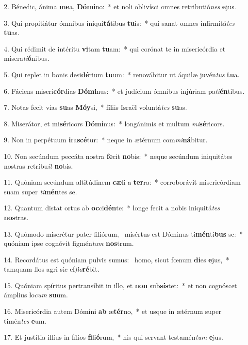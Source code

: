 2. Bénedic, ánima \textbf{me}a, \textbf{Dó}\textbf{mi}no:~*  et noli oblivísci omnes retributió\textit{nes} \textbf{e}jus.\

3. Qui propitiátur ómnibus iniqui\textbf{tá}tibus \textbf{tu}is:~*  qui sanat omnes infirmitá\textit{tes} \textbf{tu}as.\

4. Qui rédimit de intéritu \textbf{vi}tam \textbf{tu}am:~*  qui corónat te in misericórdia et misera\textit{ti}\textbf{ó}nibus.\

5. Qui replet in bonis desi\textbf{dé}rium \textbf{tu}um:~*  renovábitur ut áquilæ juvén\textit{tus} \textbf{tu}a.\

6. Fáciens miseri\textbf{cór}dias \textbf{Dó}\textbf{mi}nus:~*  et judícium ómnibus injúriam pa\textit{ti}\textbf{én}tibus.\

7. Notas fecit vias \textbf{su}as \textbf{Mó}\textbf{y}si,~*  fíliis Israël voluntá\textit{tes} \textbf{su}as.\

8. Miserátor, et mi\textbf{sé}ricors \textbf{Dó}\textbf{mi}nus:~*  longánimis et multum \textit{mi}\textbf{sé}ricors.\

9. Non in perpétuum \textbf{i}ra\textbf{scé}tur:~*  neque in ætérnum com\textit{mi}\textbf{ná}bitur.\

10. Non secúndum peccáta nostra \textbf{fe}cit \textbf{no}bis:~*  neque secúndum iniquitátes nostras retríbu\textit{it} \textbf{no}bis.\

11. Quóniam secúndum altitúdinem \textbf{cæ}li a \textbf{ter}ra:~*  corroborávit misericórdiam suam super \textit{ti}\textbf{mén}tes se.\

12. Quantum distat ortus ab \textbf{oc}ci\textbf{dén}te:~*  longe fecit a nobis iniquitá\textit{tes} \textbf{nos}tras.\

13. Quómodo miserétur pater filiórum, \dag\  misértus est Dóminus ti\textbf{mén}ti\textbf{bus} se:~*  quóniam ipse cognóvit figmén\textit{tum} \textbf{nos}trum.\

14. Recordátus est quóniam pulvis sumus: \dag\  homo, sicut fœnum \textbf{di}es \textbf{e}jus,~*  tamquam flos agri sic ef\textit{flo}\textbf{ré}bit.\

15. Quóniam spíritus pertransíbit in illo, et \textbf{non} sub\textbf{sís}tet:~*  et non cognóscet ámplius lo\textit{cum} \textbf{su}um.\

16. Misericórdia autem Dómini \textbf{ab} æ\textbf{tér}no,~*  et usque in ætérnum super timén\textit{tes} \textbf{e}um.\

17. Et justítia illíus in fílios \textbf{fi}li\textbf{ó}rum,~*  his qui servant testamén\textit{tum} \textbf{e}jus.\

